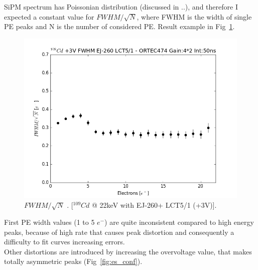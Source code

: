 \documentclass[10pt,a4paper, openany]{book}
\begin{document}
SiPM spectrum has Poissonian distribution (discussed in ..), and therefore I expected a constant value for $FWHM/\sqrt{N}$, where FWHM is the width of single PE peaks and N is the number of considered PE. Result example in Fig~\ref{fig:fwhm}.

\begin{figure}[!h]
\begin{center}
\includegraphics[scale=0.4]{imm/fwhm.png}
\end{center}
\caption{$FWHM/\sqrt{N}$ . [$^{109}Cd$ @ 22keV with EJ-260+ LCT5/1 (+3V)].} 
\label{fig:fwhm}
\end{figure}

First PE width values (1 to 5 $e^-$) are quite inconsistent compared to high energy peaks, because of high rate that causes peak distortion and consequently a difficulty to fit curves increasing errors.\\[2ex]
Other distortions are introduced by increasing the overvoltage value, that  makes totally asymmetric peaks (Fig~\ref{fig:es_conf}).
\end{document}
